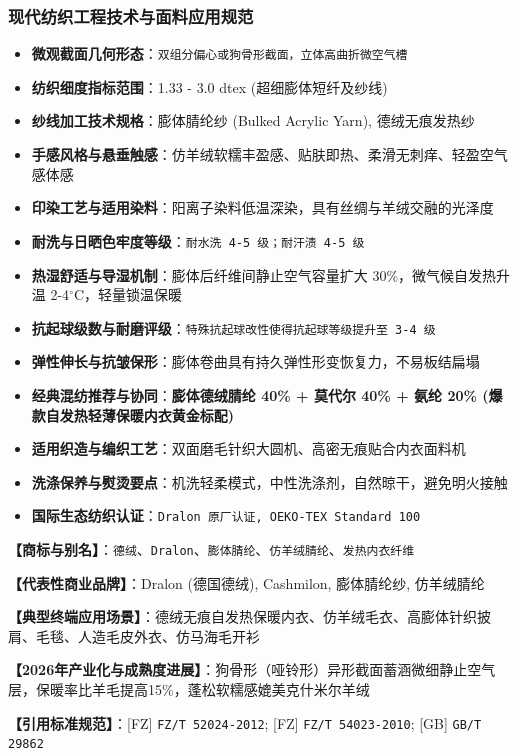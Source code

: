 \documentclass[11pt,openright,twoside,UTF8]{ctexbook}
\begin{document}
\subsubsection*{现代纺织工程技术与面料应用规范}
\begin{itemize} \setlength{\itemsep}{2pt}
    \item \textbf{微观截面几何形态}：\texttt{双组分偏心或狗骨形截面，立体高曲折微空气槽}
    \item \textbf{纺织细度指标范围}：1.33 - 3.0 dtex (超细膨体短纤及纱线)
    \item \textbf{纱线加工技术规格}：膨体腈纶纱 (Bulked Acrylic Yarn), 德绒无痕发热纱
    \item \textbf{手感风格与悬垂触感}：仿羊绒软糯丰盈感、贴肤即热、柔滑无刺痒、轻盈空气感体感
    \item \textbf{印染工艺与适用染料}：阳离子染料低温深染，具有丝绸与羊绒交融的光泽度
    \item \textbf{耐洗与日晒色牢度等级}：\texttt{耐水洗 4-5 级；耐汗渍 4-5 级}
    \item \textbf{热湿舒适与导湿机制}：膨体后纤维间静止空气容量扩大 30\%，微气候自发热升温 2-4$^\circ\mathrm{C}$，轻量锁温保暖
    \item \textbf{抗起球级数与耐磨评级}：\texttt{特殊抗起球改性使得抗起球等级提升至 3-4 级}
    \item \textbf{弹性伸长与抗皱保形}：膨体卷曲具有持久弹性形变恢复力，不易板结扁塌
    \item \textbf{经典混纺推荐与协同}：\textbf{膨体德绒腈纶 40\% + 莫代尔 40\% + 氨纶 20\% (爆款自发热轻薄保暖内衣黄金标配)}
    \item \textbf{适用织造与编织工艺}：双面磨毛针织大圆机、高密无痕贴合内衣面料机
    \item \textbf{洗涤保养与熨烫要点}：机洗轻柔模式，中性洗涤剂，自然晾干，避免明火接触
    \item \textbf{国际生态纺织认证}：\texttt{Dralon 原厂认证, OEKO-TEX Standard 100}
\end{itemize}
\vspace{0.2cm}

\noindent\textbf{【商标与别名】}：\texttt{德绒}、\texttt{Dralon}、\texttt{膨体腈纶}、\texttt{仿羊绒腈纶}、\texttt{发热内衣纤维}\par
\noindent\textbf{【代表性商业品牌】}：Dralon (德国德绒), Cashmilon, 膨体腈纶纱, 仿羊绒腈纶\par
\noindent\textbf{【典型终端应用场景】}：德绒无痕自发热保暖内衣、仿羊绒毛衣、高膨体针织披肩、毛毯、人造毛皮外衣、仿马海毛开衫\par
\noindent\textbf{【2026年产业化与成熟度进展】}：狗骨形（哑铃形）异形截面蓄涵微细静止空气层，保暖率比羊毛提高15\%，蓬松软糯感媲美克什米尔羊绒\par
\noindent\textbf{【引用标准规范】}：[FZ] \texttt{FZ/T 52024-2012}; [FZ] \texttt{FZ/T 54023-2010}; [GB] \texttt{GB/T 29862}\par
\vspace{0.5cm}
\end{document}
